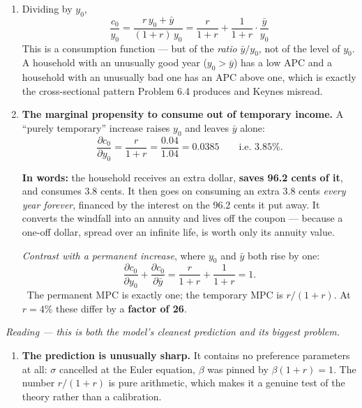\documentclass[12pt, letterpaper]{article}
\newcommand{\pd}[2]{\dfrac{\partial #1}{\partial #2}}
\begin{document}
\begin{tcolorbox}[evenbox,title={Problem 6.8 \quad The Marginal Propensity to Consume}]
\begin{enumerate}
\smallskip
\emph{Two readings of the same formula, and the second is the useful one.} Write the answer
as
\[
c_0=\underbrace{\bar y}_{\text{permanent income}}
+\underbrace{r\cdot\frac{y_0-\bar y}{1+r}}_{\text{interest on the annuitised windfall}} .
\]
The household treats the excess $y_0-\bar y$ as a windfall, saves it, and consumes only the
interest on it, forever. \checkmark\ Indeed the simulated asset path settles at exactly
$a=(y_0-\bar y)/(1+r)$ and stays there.

\item Dividing by $y_0$,
\[
\boxed{\;\frac{c_0}{y_0}=\frac{r\,y_0+\bar y}{(1+r)\,y_0}
=\frac{r}{1+r}+\frac{1}{1+r}\cdot\frac{\bar y}{y_0}\;}
\]
This is a consumption function --- but of the \emph{ratio} $\bar y/y_0$, not of the level of
$y_0$. A household with an unusually good year ($y_0>\bar y$) has a low APC and a household
with an unusually bad one has an APC above one, which is exactly the cross-sectional pattern
Problem 6.4 produces and Keynes misread.

\item \textbf{The marginal propensity to consume out of temporary income.} A ``purely
temporary'' increase raises $y_0$ and leaves $\bar y$ alone:
\[
\pd{c_0}{y_0}=\frac{r}{1+r}=\frac{0.04}{1.04}=\boxed{0.0385}
\qquad\text{i.e.\ }3.85\% .
\]
\checkmark

\smallskip
\textbf{In words:} the household receives an extra dollar, \textbf{saves 96.2 cents of it},
and consumes 3.8 cents. It then goes on consuming an extra 3.8 cents \emph{every year
forever}, financed by the interest on the 96.2 cents it put away. It converts the windfall
into an annuity and lives off the coupon --- because a one-off dollar, spread over an
infinite life, is worth only its annuity value.

\smallskip
\emph{Contrast with a permanent increase}, where $y_0$ and $\bar y$ both rise by one:
\[
\pd{c_0}{y_0}+\pd{c_0}{\bar y}=\frac{r}{1+r}+\frac{1}{1+r}=\boxed{1} .
\]
\checkmark\ The permanent MPC is exactly one; the temporary MPC is $r/(1+r)$. At $r=4\%$
these differ by a \textbf{factor of 26}.

\end{enumerate}

\smallskip
\emph{Reading --- this is both the model's cleanest prediction and its biggest problem.}

\begin{enumerate}[label=\textbf{\arabic*.},leftmargin=1.6em,itemsep=4pt,topsep=3pt]
\item \textbf{The prediction is unusually sharp.} It contains no preference parameters at
all: $\sigma$ cancelled at the Euler equation, $\beta$ was pinned by $\beta(1+r)=1$. The
number $r/(1+r)$ is pure arithmetic, which makes it a genuine test of the theory rather than
a calibration.


\end{enumerate}
\end{tcolorbox}
\end{document}
